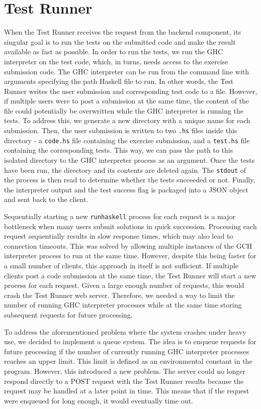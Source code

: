 \chapter{Test Runner} \label{chap:TestRunner}
When the Test Runner receives the request from the backend component, its singular goal is to run the tests on the submitted code and make the result available as fast as possible.
In order to run the tests, we run the GHC interpreter on the test code, which, in turns, needs access to the exercise submission code.
The GHC interpreter can be run from the command line with arguments specifying the path Haskell file to run.
In other words, the Test Runner writes the user submission and corresponding test code to a file.
However, if multiple users were to post a submission at the same time, the content of the file could potentially be overwritten while the GHC interpreter is running the tests.
To address this, we generate a new directory with a unique name for each submission.
Then, the user submission is written to two  \texttt{.hs} files inside this directory - a \texttt{code.hs} file containing the exercise submission, and a \texttt{test.hs} file containing the corresponding tests.
This way, we can pass the path to this isolated directory to the GHC interpreter process as an argument.
Once the tests have been run, the directory and its contents are deleted again.
The \texttt{stdout} of the process is then read to determine whether the tests succeeded or not.
Finally, the interpreter output and the test success flag is packaged into a JSON object and sent back to the client.

Sequentially starting a new \texttt{runhaskell} process for each request is a major bottleneck when many users submit solutions in quick succession.
Processing each request sequentially results in slow response times, which may also lead to connection timeouts.
This was solved by allowing multiple instances of the GCH interpreter process to run at the same time.
However, despite this being faster for a small number of clients, this approach in itself is not sufficient.
If multiple clients post a code submission at the same time, the Test Runner will start a new process for each request.
Given a large enough number of requests, this would crash the Test Runner web server.
Therefore, we needed a way to limit the number of running GHC interpreter processes while at the same time storing subsequent requests for future processing.

To address the aforementioned problem where the system crashes under heavy use, we decided to implement a queue system.
The idea is to enqueue requests for future processing if the number of currently running GHC interpreter processes reaches an upper limit.
This limit is defined as an environmental constant in the program.
However, this introduced a new problem.
The server could no longer respond directly to a POST request with the Test Runner results because the request may be handled at a later point in time.
This means that if the request were enqueued for long enough, it would eventually time out.



